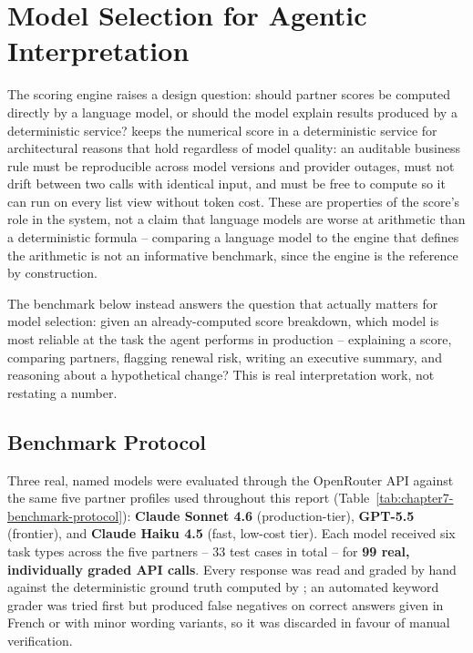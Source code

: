 \section{Model Selection for Agentic Interpretation}
\label{sec:chapter7-model-selection}
The scoring engine raises a design question: should partner scores be computed directly by a language model, or should the model explain results produced by a deterministic service? \projectname{} keeps the numerical score in a deterministic service for architectural reasons that hold regardless of model quality: an auditable business rule must be reproducible across model versions and provider outages, must not drift between two calls with identical input, and must be free to compute so it can run on every list view without token cost. These are properties of the score's role in the system, not a claim that language models are worse at arithmetic than a deterministic formula -- comparing a language model to the engine that defines the arithmetic is not an informative benchmark, since the engine is the reference by construction.

The benchmark below instead answers the question that actually matters for model selection: given an already-computed score breakdown, which model is most reliable at the task the agent performs in production -- explaining a score, comparing partners, flagging renewal risk, writing an executive summary, and reasoning about a hypothetical change? This is real interpretation work, not restating a number.

\subsection{Benchmark Protocol}
\label{subsec:chapter7-benchmark-protocol}
Three real, named models were evaluated through the OpenRouter API against the same five partner profiles used throughout this report (Table~\ref{tab:chapter7-benchmark-protocol}): \textbf{Claude Sonnet 4.6} (production-tier), \textbf{GPT-5.5} (frontier), and \textbf{Claude Haiku 4.5} (fast, low-cost tier). Each model received six task types across the five partners -- 33 test cases in total -- for \textbf{99 real, individually graded API calls}. Every response was read and graded by hand against the deterministic ground truth computed by ; an automated keyword grader was tried first but produced false negatives on correct answers given in French or with minor wording variants, so it was discarded in favour of manual verification.

